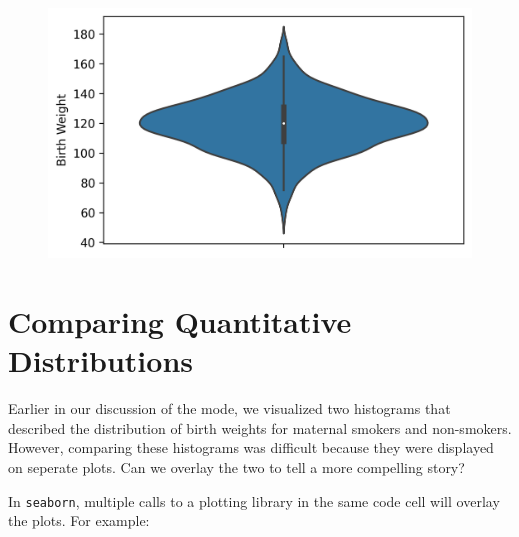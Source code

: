 \documentclass[
  letterpaper,
  DIV=11,
  numbers=noendperiod]{scrreprt}
\begin{document}
\begin{figure}[H]

{\centering \includegraphics{visualization_1/visualization_1_files/figure-pdf/cell-19-output-1.png}

}

\end{figure}

\hypertarget{comparing-quantitative-distributions}{%
\section{Comparing Quantitative
Distributions}\label{comparing-quantitative-distributions}}

Earlier in our discussion of the mode, we visualized two histograms that
described the distribution of birth weights for maternal smokers and
non-smokers. However, comparing these histograms was difficult because
they were displayed on seperate plots. Can we overlay the two to tell a
more compelling story?

In \texttt{seaborn}, multiple calls to a plotting library in the same
code cell will overlay the plots. For example:
\end{document}
